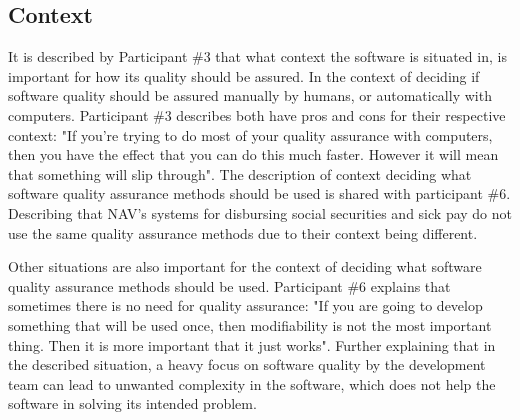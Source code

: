\subsection{Context} \label{sec:context}
It is described by Participant \#3 that what context the software is situated in, is important for how its quality should be assured. In the context of deciding if software quality should be assured manually by humans, or automatically with computers. Participant \#3 describes both have pros and cons for their respective context: "If you're trying to do most of your quality assurance with computers, then you have the effect that you can do this much faster. However it will mean that something will slip through". The description of context deciding what software quality assurance methods should be used is shared with participant \#6. Describing that NAV's systems for disbursing social securities and sick pay do not use the same quality assurance methods due to their context being different.




Other situations are also important for the context of deciding what software quality assurance methods should be used. Participant \#6 explains that sometimes there is no need for quality assurance: "If you are going to develop something that will be used once, then modifiability is not the most important thing. Then it is more important that it just works". Further explaining that in the described situation, a heavy focus on software quality by the development team can lead to unwanted complexity in the software, which does not help the software in solving its intended problem.

